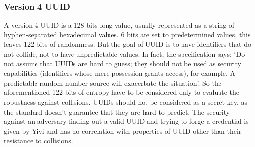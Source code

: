 \documentclass{report}
\begin{document}
\subsubsection{Version 4 UUID}
A version 4 UUID is a 128 bits-long value, usually represented as a string of hyphen-separated hexadecimal values. 6 bits are set to predetermined values, this leaves 122 bits of
randomness. But the goal of UUID is to have identifiers that do not collide, not to have unpredictable values. In fact, the specification says: \enquote*{Do not assume that UUIDs are 
hard to guess; they should not be used as security capabilities (identifiers whose mere possession grants access), for example. A predictable random number source will exacerbate the
situation}. So the aforementioned 122 bits of entropy have to be considered only to evaluate the robustness against collisions. UUIDs should not be considered as a secret key, as
the standard doesn't guarantee that they are hard to predict. The security against an adversary finding out a valid UUID and trying to forge a credential is given by Yivi and has
no correlation with properties of UUID other than their resistance to collisions.
\end{document}
